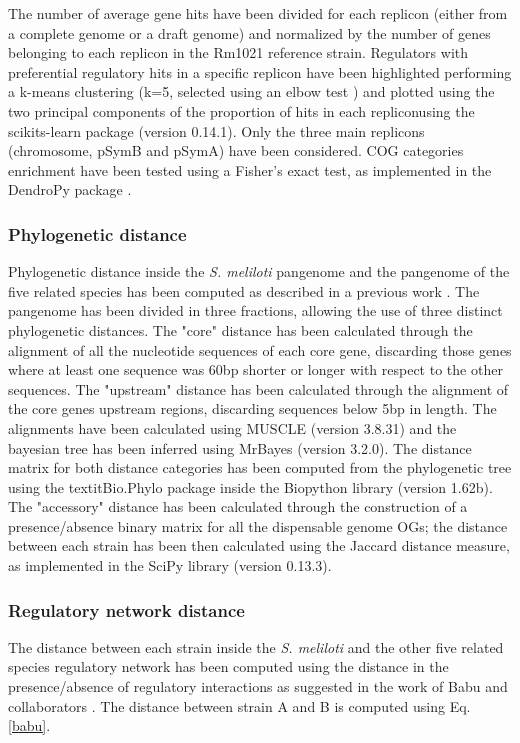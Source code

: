 The number of average gene hits have been divided for each replicon (either from a complete genome or a draft genome) and normalized by the number of genes belonging to each replicon in the Rm1021 reference strain. Regulators with preferential regulatory hits in a specific replicon have been highlighted performing a k-means clustering (k=5, selected using an elbow test \cite{ward1963hierarchical}) and plotted using the two principal components of the proportion of hits in each repliconusing the scikits-learn package (version 0.14.1)\cite{pedregosa2011scikit}. Only the three main replicons (chromosome, pSymB and pSymA) have been considered. COG categories enrichment have been tested using a Fisher's exact test, as implemented in the DendroPy package \cite{sukumaran2010dendropy}.

\subsubsection{Phylogenetic distance}
Phylogenetic distance inside the \textit{S. meliloti} pangenome and the pangenome of the five related species has been computed as described in a previous work \cite{galardini2013replicon}. The pangenome has been divided in three fractions, allowing the use of three distinct phylogenetic distances. The "core" distance has been calculated through the alignment of all the nucleotide sequences of each core gene, discarding those genes where at least one sequence was 60bp shorter or longer with respect to the other sequences. The "upstream" distance has been calculated through the alignment of the core genes upstream regions, discarding sequences below 5bp in length. The alignments have been calculated using MUSCLE (version 3.8.31)\cite{edgar2004muscle} and the bayesian tree has been inferred using MrBayes (version 3.2.0)\cite{ronquist2012mrbayes}. The distance matrix for both distance categories has been computed from the phylogenetic tree using the textit{Bio.Phylo} package inside the Biopython library (version 1.62b)\cite{talevich2012bio}. The "accessory" distance has been calculated through the construction of a presence/absence binary matrix for all the dispensable genome OGs; the distance between each strain has been then calculated using the Jaccard distance measure, as implemented in the SciPy library (version 0.13.3)\cite{jones2001scipy}.

\subsubsection{Regulatory network distance}
The distance between each strain inside the \textit{S. meliloti} and the other five related species regulatory network has been computed using the distance in the presence/absence of regulatory interactions as suggested in the work of Babu and collaborators \cite{babu2006evolutionary}. The distance between strain A and B is computed using Eq. \ref{babu}.

